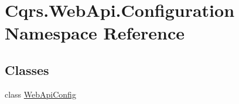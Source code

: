 \hypertarget{namespaceCqrs_1_1WebApi_1_1Configuration}{}\section{Cqrs.\+Web\+Api.\+Configuration Namespace Reference}
\label{namespaceCqrs_1_1WebApi_1_1Configuration}
\subsection*{Classes}
\begin{DoxyCompactItemize}
\item 
class \hyperlink{classCqrs_1_1WebApi_1_1Configuration_1_1WebApiConfig}{Web\+Api\+Config}
\end{DoxyCompactItemize}
